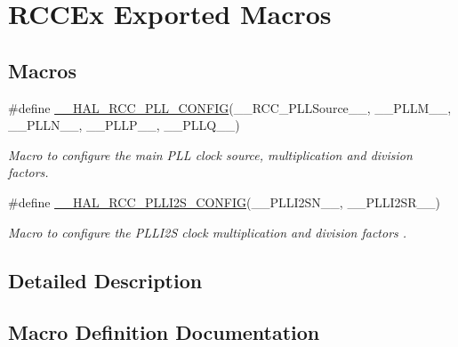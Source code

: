 \hypertarget{group___r_c_c_ex___exported___macros}{}\section{R\+C\+C\+Ex Exported Macros}
\label{group___r_c_c_ex___exported___macros}
\subsection*{Macros}
\begin{DoxyCompactItemize}
\item 
\#define \mbox{\hyperlink{group___r_c_c_ex___exported___macros_ga56d9ad48b28e7aa4ad3aadca5b4fd431}{\+\_\+\+\_\+\+H\+A\+L\+\_\+\+R\+C\+C\+\_\+\+P\+L\+L\+\_\+\+C\+O\+N\+F\+IG}}(\+\_\+\+\_\+\+R\+C\+C\+\_\+\+P\+L\+L\+Source\+\_\+\+\_\+,  \+\_\+\+\_\+\+P\+L\+L\+M\+\_\+\+\_\+,  \+\_\+\+\_\+\+P\+L\+L\+N\+\_\+\+\_\+,  \+\_\+\+\_\+\+P\+L\+L\+P\+\_\+\+\_\+,  \+\_\+\+\_\+\+P\+L\+L\+Q\+\_\+\+\_\+)
\begin{DoxyCompactList}\small\item\em Macro to configure the main P\+LL clock source, multiplication and division factors. \end{DoxyCompactList}\item 
\#define \mbox{\hyperlink{group___r_c_c_ex___exported___macros_ga5a2fa2687b621f6eda72457d09715298}{\+\_\+\+\_\+\+H\+A\+L\+\_\+\+R\+C\+C\+\_\+\+P\+L\+L\+I2\+S\+\_\+\+C\+O\+N\+F\+IG}}(\+\_\+\+\_\+\+P\+L\+L\+I2\+S\+N\+\_\+\+\_\+,  \+\_\+\+\_\+\+P\+L\+L\+I2\+S\+R\+\_\+\+\_\+)
\begin{DoxyCompactList}\small\item\em Macro to configure the P\+L\+L\+I2S clock multiplication and division factors . \end{DoxyCompactList}\end{DoxyCompactItemize}


\subsection{Detailed Description}


\subsection{Macro Definition Documentation}
\mbox{\label{group___r_c_c_ex___exported___macros_ga56d9ad48b28e7aa4ad3aadca5b4fd431}} 
